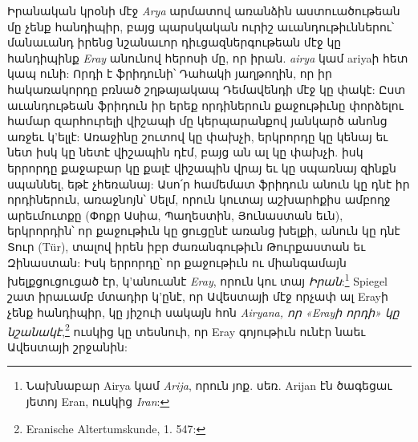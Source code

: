 \documentclass{article}
\begin{document}
{Իրանական կրօնի մէջ \emph{Arya} արմատով առանձին աստուածութեան մը չենք հանդիպիր, բայց պարսկական ուրիշ աւանդութիւններու՝ մանաւանդ իրենց նշանաւոր դիւցազներգութեան մէջ կը հանդիպինք \emph{Eray} անունով հերոսի մը, որ իրան. \emph{airya} կամ ariyaի հետ կապ ունի: Որդի է ֆրիդունի՝ Դահակի յաղթողին, որ իր հակառակորդը բռնած շղթայակապ Դեմավենդի մէջ կը փակէ: Ըստ աւանդութեան ֆրիդուն իր երեք որդիներուն քաջութիւնը փորձելու համար զարհուրելի վիշապի մը կերպարանքով յանկարծ անոնց առջեւ կ'ելլէ: Առաջինը շուտով կը փախչի, երկրորդը կը կենայ եւ նետ իսկ կը նետէ վիշապին դէմ, բայց ան ալ կը փախչի. իսկ երրորդը քաջաբար կը քալէ վիշապին վրայ եւ կը սպառնայ զինքն սպաննել, եթէ չհեռանայ: Ասո՛ր համեմատ ֆրիդուն անուն կը դնէ իր որդիներուն, առաջնոյն՝ Սելմ, որուն կուտայ աշխարհքիս ամբողջ արեւմուտքը (Փոքր Ասիա, Պաղեստին, Յունաստան եւն), երկրորդին՝ որ քաջութիւն կը ցուցընէ առանց խելքի, անուն կը դնէ Տուր (Tür), տալով իրեն իբր ժառանգութիւն Թուրքաստան եւ Զինաստան: Իսկ երրորդը՝ որ քաջութիւն ու միանգամայն խելքցուցուցած էր, կ'անուանէ \emph{Eray}, որուն կու տայ \emph{Իրան}:\footnote{Նախնաբար Airya կամ \emph{Arija}, որուն յոք. սեռ. Arijan էն ծագեցաւ յետոյ Eran, ուսկից \emph{Iran}:} Spiegel շատ իրաւամբ մտադիր կ'ընէ, որ Ավեստայի մէջ որչափ ալ Erayի չենք հանդիպիր, կը յիշուի սակայն հոն \emph{Airyana, որ «Erayի որդի» կը նշանակէ},\footnote{Eranische Altertumskunde, 1. 547:} ուսկից կը տեսնուի, որ Eray գոյութիւն ունէր նաեւ Ավեստայի շրջանին:

}
\end{document}
